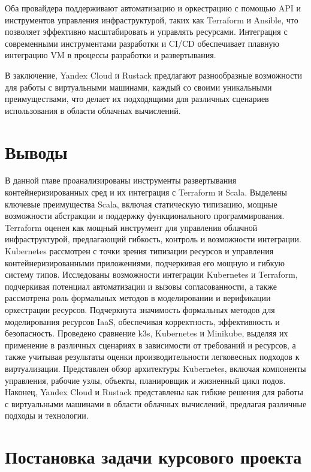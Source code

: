 Оба провайдера поддерживают автоматизацию и оркестрацию с помощью API и
инструментов управления инфраструктурой, таких как Terraform и Ansible, что
позволяет эффективно масштабировать и управлять ресурсами. Интеграция с
современными инструментами разработки и CI/CD обеспечивает плавную интеграцию VM
в процессы разработки и развертывания.

В заключение, Yandex Cloud и Rustack предлагают разнообразные возможности для
работы с виртуальными машинами, каждый со своими уникальными преимуществами, что
делает их подходящими для различных сценариев использования в области облачных
вычислений.

\section{Выводы}

В данной главе проанализированы инструменты развертывания контейнеризированных
сред и их интеграция с Terraform и Scala. Выделены ключевые преимущества Scala,
включая статическую типизацию, мощные возможности абстракции и поддержку функционального 
программирования. Terraform оценен как мощный инструмент для управления облачной 
инфраструктурой, предлагающий гибкость, контроль и возможности интеграции. 
Kubernetes рассмотрен с точки зрения типизации ресурсов и управления
контейнеризированными приложениями, подчеркивая его мощную и гибкую систему типов. 
Исследованы возможности интеграции Kubernetes и Terraform, подчеркивая потенциал 
автоматизации и вызовы согласованности, а также рассмотрена роль формальных методов 
в моделировании и верификации оркестрации ресурсов. Подчеркнута значимость формальных методов 
для моделирования ресурсов IaaS, обеспечивая корректность, эффективность и безопасность. 
Проведено сравнение k3s, Kubernetes и Minikube, выделяя их применение в различных 
сценариях в зависимости от требований и ресурсов, а также учитывая результаты оценки 
производительности легковесных подходов к виртуализации. Представлен обзор архитектуры 
Kubernetes, включая компоненты управления, рабочие узлы, объекты, планировщик и 
жизненный цикл подов. Наконец, Yandex Cloud и Rustack представлены как гибкие
решения для работы с виртуальными машинами в области облачных вычислений, 
предлагая различные подходы и технологии.

\section{Постановка задачи курсового проекта}

